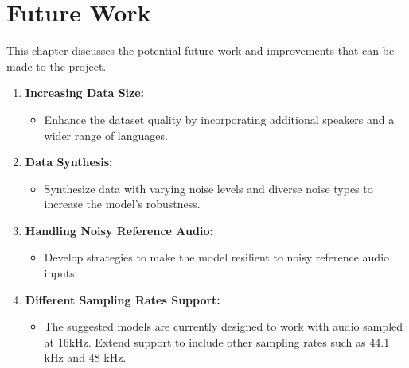 \chapter{Future Work}
\label{chap:future-work}
This chapter discusses the potential future work and improvements that can be made to the project.

\begin{enumerate}
    \item \textbf{Increasing Data Size:}
          \begin{itemize}
              \item Enhance the dataset quality by incorporating additional speakers and a wider range of languages.
          \end{itemize}

    \item \textbf{Data Synthesis:}
          \begin{itemize}
              \item Synthesize data with varying noise levels and diverse noise types to increase the model's robustness.
          \end{itemize}

    \item \textbf{Handling Noisy Reference Audio:}
          \begin{itemize}
              \item Develop strategies to make the model resilient to noisy reference audio inputs.
          \end{itemize}

    \item \textbf{Different Sampling Rates Support:}
        \begin{itemize}
            \item The suggested models are currently designed to work with audio sampled at 16kHz. Extend support to include other sampling rates such as 44.1 kHz and 48 kHz.
        \end{itemize}



\end{enumerate}
